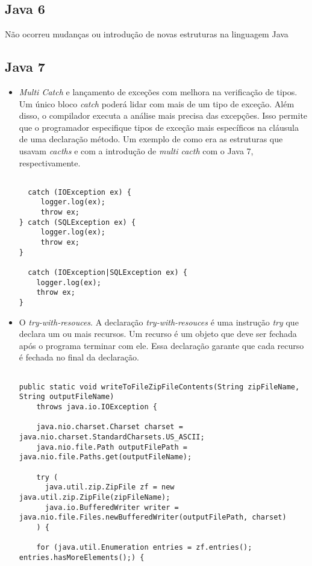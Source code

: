 \subsection {Java 6}
Não ocorreu mudanças ou introdução de novas estruturas na linguagem Java\\
\subsection {Java 7}
  \begin{itemize}
  \item {\it Multi Catch} e lançamento de exceções com melhora na verificação de tipos. Um único bloco {\it catch} poderá lidar com mais de um tipo de exceção. Além disso, o compilador executa a análise mais precisa das excepções. Isso permite que o programador especifique tipos de exceção mais específicos na cláusula de uma declaração método. Um exemplo de como era as estruturas que usavam {\it cacths} e com a introdução de {\it multi cacth} com o Java 7, respectivamente.
  \begin{verbatim}

  catch (IOException ex) {
     logger.log(ex);
     throw ex;
} catch (SQLException ex) {
     logger.log(ex);
     throw ex;
}

  catch (IOException|SQLException ex) {
    logger.log(ex);
    throw ex;
}
  \end{verbatim}
  \item O {\it try-with-resouces}. A declaração {\it try-with-resouces} é uma instrução {\it try} que declara um ou mais recursos. Um recurso é um objeto que deve ser fechada após o programa terminar com ele. Essa declaração garante que cada recurso é fechada no final da declaração.
  \begin{verbatim}

public static void writeToFileZipFileContents(String zipFileName, String outputFileName)
    throws java.io.IOException {

    java.nio.charset.Charset charset = java.nio.charset.StandardCharsets.US_ASCII;
    java.nio.file.Path outputFilePath = java.nio.file.Paths.get(outputFileName);

    try (
      java.util.zip.ZipFile zf = new java.util.zip.ZipFile(zipFileName);
      java.io.BufferedWriter writer = java.nio.file.Files.newBufferedWriter(outputFilePath, charset)
    ) {

    for (java.util.Enumeration entries = zf.entries(); entries.hasMoreElements();) {


\end{verbatim}
\end{itemize}
